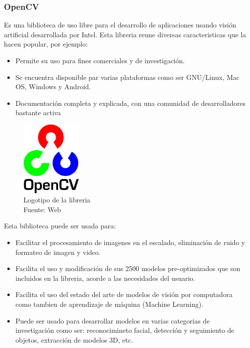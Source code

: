 \subsubsection{OpenCV}
Es una biblioteca de uso libre para el desarrollo de aplicaciones usando visión artificial desarrollada por Intel. Esta libreria reune diversas caracteristicas que la hacen popular, por ejemplo: 
\begin{itemize}
    \item Permite su uso para fines comerciales y de investigación.
    \item Se encuentra disponible par varias plataformas como ser GNU/Linux, Mac OS, Windows y Android.
    \item Documentación completa y explicada, con una comunidad de desarrolladores bastante activa
\end{itemize}

\begin{figure}[H]
    \begin{center}
        \includegraphics[width=3cm]{img/capitulo_2/cv2_logo.png}
    \end{center}
    \caption{Logotipo de la libreria\\Fuente: Web}
    \label{fig:cv2_logo}
\end{figure}

Esta biblioteca puede ser usada para:
\begin{itemize}
    \item Facilitar el procesamiento de imagenes en el escalado, eliminación de ruido y formateo de imagen y video.
    \item Facilita el uso y modificación de sus 2500 modelos pre-optimizados que son incluidos en la libreria, acorde a las necesidades del usuario.
    \item Facilita el uso del estado del arte de modelos de visión por computadora como tambien de aprendizaje de máquina (Machine Learning).
    \item Puede ser usado para desarrollar modelos en varias categorias de inveetigación como ser: reconocimineto facial, detección y seguimiento de objetos, extracción de modelos 3D, etc.
\end{itemize}


